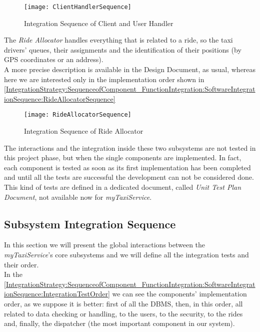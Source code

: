 \documentclass[\mainpath/main]{subfiles}
\begin{document}
\begin{figure}[h]
	\centering
	\texttt{[image: ClientHandlerSequence]}
	\caption{Integration Sequence of Client and User Handler}
	\label{IntegrationStrategy:SequenceofComponent_FunctionIntegration:SoftwareIntegrationSequence:ClientHandlerSequence}
\end{figure}

The \textit{Ride Allocator} handles everything that is related to a ride, so the taxi drivers' queues, their assignments and the identification of their positions (by GPS coordinates or an address).\\
A more precise description is available in the Design Document, as usual, whereas here we are interested only in the implementation order shown in \autoref{IntegrationStrategy:SequenceofComponent_FunctionIntegration:SoftwareIntegrationSequence:RideAllocatorSequence}

\begin{figure}[h]
	\centering
	\texttt{[image: RideAllocatorSequence]}
	\caption{Integration Sequence of Ride Allocator}
	\label{IntegrationStrategy:SequenceofComponent_FunctionIntegration:SoftwareIntegrationSequence:RideAllocatorSequence}
\end{figure}

The interactions and the integration inside these two subsystems are not tested in this project phase, but when the single components are implemented. In fact, each component is tested as soon as its first implementation has been completed and until all the tests are successful the development can not be considered done.\\
This kind of tests are defined in a dedicated document, called \textit{Unit Test Plan Document}, not available now for \textit{myTaxiService}.

\subsection{Subsystem Integration Sequence}
\label{IntegrationStrategy:SequenceofComponent_FunctionIntegration:SubsystemIntegrationSequence}
In this section we will present the global interactions between the \textit{myTaxiService}'s core subsystems and we will define all the integration tests and their order.\\
In the \autoref{IntegrationStrategy:SequenceofComponent_FunctionIntegration:SoftwareIntegrationSequence:IntegrationTestOrder} we can see the components' implementation order, as we suppose it is better: first of all the DBMS, then, in this order, all related to data checking or handling, to the users, to the security, to the rides and, finally, the dispatcher (the most important component in our system).
\end{document}

